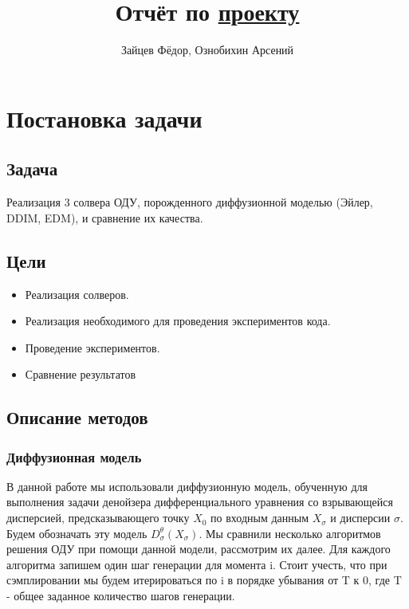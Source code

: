 \documentclass[a4paper]{article}
\title{Отчёт по \href{https://github.com/ARS404/DiffusionProject}{проекту}}
\author{Зайцев Фёдор, Ознобихин Арсений}
\begin{document}
    \maketitle{}
    \tableofcontents
    \newpage

    \section{Постановка задачи}
    \subsection{Задача}
    Реализация 3 солвера ОДУ, порожденного диффузионной моделью (Эйлер, DDIM, EDM),
    и сравнение их качества.

    \subsection{Цели}
    \begin{itemize}
        \item Реализация солверов.
        \item Реализация необходимого для проведения экспериментов кода.
        \item Проведение экспериментов.
        \item Сравнение результатов
    \end{itemize}

    \subsection{Описание методов}

    \subsubsection{Диффузионная модель}
    В данной работе мы использовали диффузионную модель, обученную для выполнения задачи денойзера дифференциального уравнения со взрывающейся дисперсией, предсказывающего точку $X_0$ по входным данным $X_{\sigma}$ и дисперсии $\sigma$. Будем обозначать эту модель $D^{\theta}_{\sigma}(X_{\sigma})$. Мы сравнили несколько алгоритмов решения ОДУ при помощи данной модели, рассмотрим их далее. Для каждого алгоритма запишем один шаг генерации для момента i. Стоит учесть, что при сэмплировании мы будем итерироваться по i в порядке убывания от T к 0, где T - общее заданное количество шагов генерации.
    
\end{document}
